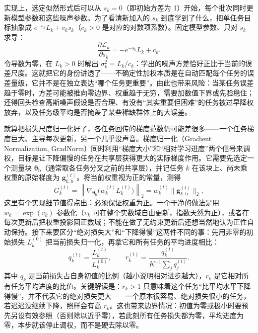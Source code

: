 实现上，选定似然形式后可以从 $s_k=0$（即初始方差为 1）开始，每个批次同时更新模型参数和这些噪声参数。为了看清新加入的 $s_k$ 到底学到了什么，把单任务目标抽象成 $e^{-s_k}L_k+c_ks_k$（$c_k>0$ 是对应的对数项系数）。固定模型参数、只对 $s_k$ 求导：
\begin{equation}
  \frac{\partial\mathcal L_k}{\partial s_k}
  =-e^{-s_k}L_k+c_k.
\end{equation}
令导数为零，在 $L_k>0$ 时解出 $\sigma_k^2=L_k/c_k$：学出的噪声方差恰好正比于当前的误差尺度。这就把它的身份讲透了——不确定性加权本质是在自动匹配每个任务的误差量级，它并不是在独立表达“哪个任务更重要”。由此也带来风险：当某任务误差趋于零时，方差可能被推向零边界、权重趋于无穷，需要加数值下界或先验稳住；还得回头检查高斯噪声假设是否合理、有没有“其实重要但困难”的任务被过早降权放弃，以及任务级平均是否掩盖了某些稀缺群体上的大误差。

就算把损失尺度归一化好了，各任务回传的梯度范数仍可能差很多——一个任务梯度巨大、主导每次更新，另一个几乎没声音。梯度归一化（Gradient Normalization, GradNorm）同时利用“梯度大小”和“相对学习进度”两个信号来调权，目标是让下降偏慢的任务在共享层获得更大的实际梯度作用。它需要先选定一个测量块 $\bm{\theta}_{\mathrm b}$（通常取各任务分叉之前的共享层），并记任务 $k$ 在该块上、尚未乘权重的原始梯度为 $\bm g_{k,\mathrm b}^{(t)}$。将当前权重视为正的常量，测得
\begin{equation}
  G_k^{(t)}
  =\left\|\nabla_{\bm{\theta}_{\mathrm b}}
     \bigl(w_k^{(t)}L_k^{(t)}\bigr)\right\|_2
  =w_k^{(t)}\|\bm g_{k,\mathrm b}^{(t)}\|_2,
  \label{eq:ket-sharing-gradnorm-size}
\end{equation}
这里有个实现细节值得点出：必须保证权重为正。一个干净的做法是用 $w_k=\exp(v_k)$ 参数化（$v_k$ 可在整个实数域自由更新，指数天然为正），或者在每次更新后把权重投影回正数域；不能在做了无约束更新后还想当然地认为正性自动保持。接下来要区分“绝对损失大”和“下降得慢”这两件不同的事：先用非零的初始损失 $L_k^{(0)}$ 把当前损失归一化，再拿它和所有任务的平均进度相比：
\begin{equation}
  q_k^{(t)}=\frac{L_k^{(t)}}{L_k^{(0)}},
  \qquad
  r_k^{(t)}
  =\frac{q_k^{(t)}}{K^{-1}\sum_jq_j^{(t)}}.
  \label{eq:ket-sharing-gradnorm-rate}
\end{equation}
其中 $q_k$ 是当前损失占自身初值的比例（越小说明相对进步越大），$r_k$ 是它相对所有任务平均进度的比值。关键解读是：$r_k>1$ 只意味着这个任务“比平均水平下降得慢”，并不代表它的绝对损失更大——一个原本很容易、绝对损失很小的任务，若迟迟没继续下降，照样会有高 $r_k$。这也带来边界情况：初值为零或极小时要预先另设有效参照（否则除以近乎零），若此刻所有任务损失都为零，平均进度为零，本步就该停止调权，而不是硬去除以零。

